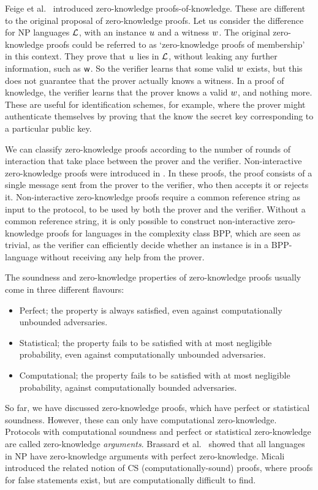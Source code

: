 Feige et al.~\cite{FeigeFS87} introduced zero-knowledge proofs-of-knowledge. These are different to the original proposal of zero-knowledge proofs. Let us consider the difference for \textsf{NP} languages $\mathcal{L}$, with an instance $u$ and a witness $w$. The original zero-knowledge proofs could be referred to as `zero-knowledge proofs of membership' in this context. They prove that $u$ lies in $\mathcal{L}$, without leaking any further information, such as $\mathsf{w}$. So the verifier learns that some valid $w$ exists, but this does not guarantee that the prover actually knows a witness. In a proof of knowledge, the verifier learns that the prover knows a valid $w$, and nothing more. These are useful for identification schemes, for example, where the prover might authenticate themselves by proving that the know the secret key corresponding to a particular public key.

We can classify zero-knowledge proofs according to the number of rounds of interaction that take place between the prover and the verifier. Non-interactive zero-knowledge proofs were introduced in \cite{BFM}. In these proofs, the proof consists of a single message sent from the prover to the verifier, who then accepts it or rejects it. Non-interactive zero-knowledge proofs require a common reference string as input to the protocol, to be used by both the prover and the verifier. Without a common reference string, it is only possible to construct non-interactive zero-knowledge proofs for languages in the complexity class \textsf{BPP}, which are seen as trivial, as the verifier can efficiently decide whether an instance is in a \textsf{BPP}-language without receiving any help from the prover.

The soundness and zero-knowledge properties of zero-knowledge proofs usually come in three different flavours:
\begin{itemize}
\item Perfect; the property is always satisfied, even against computationally unbounded adversaries.
\item Statistical; the property fails to be satisfied with at most negligible probability, even against computationally unbounded adversaries.
\item Computational; the property fails to be satisfied with at most negligible probability, against computationally bounded adversaries.
\end{itemize}
So far, we have discussed zero-knowledge proofs, which have perfect or statistical soundness. However, these can only have computational zero-knowledge. Protocols with computational soundness and perfect or statistical zero-knowledge are called zero-knowledge \emph{arguments}. Brassard et al.~\cite{BCC} showed that all languages in NP have zero-knowledge arguments with perfect zero-knowledge. Micali \cite{Mic00} introduced the related notion of CS (computationally-sound) proofs, where proofs for false statements exist, but are computationally difficult to find.

